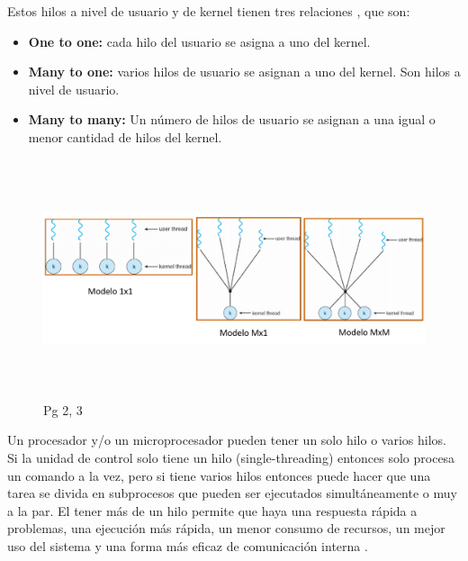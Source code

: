 \documentclass[12pt,letterpaper]{article}
\begin{document}
Estos hilos a nivel de usuario y de kernel tienen tres relaciones \cite{THilos}, que son:
\begin{itemize}
    \item \textbf{One to one:} cada hilo del usuario se asigna a uno del kernel.
    \item \textbf{Many to one:} varios hilos de usuario se asignan a uno del kernel. Son hilos a nivel de usuario.
    \item \textbf{Many to many:} Un número de hilos de usuario se asignan a una igual o menor cantidad de hilos del kernel.\\[0.5cm]
\end{itemize}

\begin{figure}[h!]
    \centering
    \includegraphics[width=18cm, height=7cm]{Modelos.png}
    \caption{\label{Figura 2} Pg 2, 3 \cite{THilos}}
\end{figure} 

Un procesador y/o un microprocesador pueden tener un solo hilo o varios hilos. Si la unidad de control solo tiene un hilo (single-threading) entonces solo procesa un comando a la vez, pero si tiene varios hilos entonces puede hacer que una tarea se divida en subprocesos que pueden ser ejecutados simultáneamente o muy a la par. El tener más de un hilo permite que haya una respuesta rápida a problemas, una ejecución más rápida, un menor consumo de recursos, un mejor uso del sistema y una forma más eficaz de comunicación interna \cite{Hilos}. \\[1cm]
\end{document}
